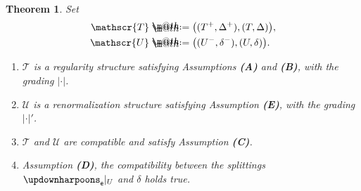 \documentclass[10pt, reqno]{amsart}
\makeatletter
\numberwithin{subsection}{section}
\numberwithin{subsubsection}{subsection}
\numberwithin{equation}{section} %
\theoremstyle{mystyle}
\newtheorem{thm}{Theorem}
\theoremstyle{mystyle2}
\theoremstyle{mystyle3}
\newcommand*{\defeq}{\mathrel{\rlap{%
                     \raisebox{0.3ex}{$\m@th\cdot$}}%
                     \raisebox{-0.3ex}{$\m@th\cdot$}}%
                     =}
\makeatother
\begin{document}
\begin{thm}\label{thm: all requirements of regul and renor str}
Set
\begin{align*}
\mathscr{T} &\defeq  \big((T^+,\Delta^+), (T,\Delta)\big),   \\
\mathscr{U} &\defeq  \big((U^-,\delta^-), (U,\delta)\big).
\end{align*}

\begin{enumerate}
\setlength{\itemsep}{0.1cm}

\item $\mathscr{T}$ is a regularity structure satisfying Assumptions \textbf{\textsf{(A)}} and \textbf{\textsf{(B)}}, with the grading $|\cdot|$.

\item $\mathscr{U}$ is a renormalization structure satisfying Assumption \textbf{\textsf{(E)}}, with the grading $|\cdot|'$.

\item $\mathscr{T}$ and $\mathscr{U}$ are compatible and satisfy Assumption \textbf{\textsf{(C)}}.

\item Assumption \textbf{\textsf{(D)}}, the compatibility between the splittings ${\updownharpoons_{\sf e}}\vert_U$ and $\delta$ holds true.

\end{enumerate}

\end{thm}   

\medskip
\end{document}
